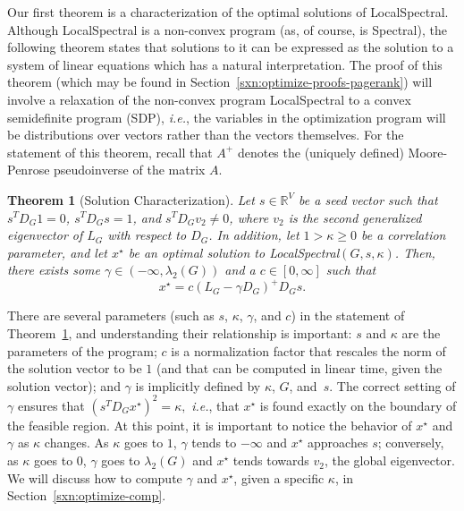 \documentclass[11pt]{article}
\newtheorem{theorem}{Theorem}
\begin{document}
Our first theorem is a characterization of the optimal solutions of 
\textsf{LocalSpectral}. 
Although \textsf{LocalSpectral} is a non-convex program (as, of course, is 
\textsf{Spectral}), the following theorem states that solutions to it can be 
expressed as the solution to a system of linear equations which has a 
natural interpretation.
The proof of this theorem (which may be found in 
Section~\ref{sxn:optimize-proofs-pagerank}) will involve a relaxation of the 
non-convex program \textsf{LocalSpectral} to a convex semidefinite program (SDP), 
\emph{i.e.}, the variables in the optimization program will be distributions 
over vectors rather than the vectors themselves.
For the statement of this theorem, recall that $A^{+}$ denotes the (uniquely 
defined) Moore-Penrose pseudoinverse of the matrix $A$.

\begin{theorem}[Solution Characterization]
\label{thm:pagerank}
Let $s \in \mathbb{R}^{V}$ be a seed vector such that $s^T D_G 1 =0$, 
$s^T D_G s = 1$, and $s^T D_G v_2 \neq 0$, where $v_{2}$ is the second 
generalized eigenvector of $L_G$ with respect to $D_G$.
In addition, let $1> \kappa \geq 0$ be a correlation parameter, and let
$x^{\star}$ be an optimal solution to \textsf{LocalSpectral}$(G,s,\kappa)$.
Then, there exists some $\gamma \in (-\infty, \lambda_{2}(G))$ and a 
$c \in [0, \infty]$ such that 
\begin{equation}
\label{eqn:xstar}
 x^{\star} = c(L_{G}-\gamma D_G)^{+} D_G s. 
\end{equation}
\end{theorem}

\noindent
There are several parameters (such as $s$, $\kappa$, $\gamma$, and $c$) in 
the statement of Theorem~\ref{thm:pagerank}, and understanding their 
relationship is important:
$s$ and $\kappa$ are the parameters of the program; $c$ is a normalization 
factor that rescales the norm of the solution vector to be $1$ (and that can 
be computed in linear time, given the solution vector); and $\gamma$ is 
implicitly defined by $\kappa$, $G$, and~$s$. 
The correct setting of $\gamma$ ensures that 
$(s^T D_{G} x^\star)^2 = \kappa,$ \emph{i.e.}, that $x^\star$ is found 
exactly on the boundary of the feasible region.
At this point, it is important to notice the behavior of $x^\star$ and 
$\gamma$ as $\kappa$ changes. 
As $\kappa$ goes to $1$, $\gamma$ tends to $-\infty$ and $x^\star$ 
approaches $s$;
conversely, as $\kappa$ goes to $0$,  $\gamma$ goes to $\lambda_2(G)$ and 
$x^\star$ tends towards $v_2$, the global eigenvector.
We will discuss how to compute $\gamma$ and $x^\star$, given a specific 
$\kappa$, in Section~\ref{sxn:optimize-comp}.
\end{document}
